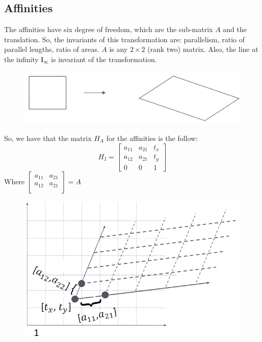 \documentclass[12pt, a4paper]{report}
\begin{document}
    \subsection{Affinities}
    The affinities have six degree of freedom, which are the sub-matrix $A$ and the translation. So, the invariants of this transformation are: parallelism, ratio of parallel lengths, ratio of areas.
    $A$ is any $2 \times 2$ (rank two) matrix. Also, the line at the infinity $\boldsymbol{l}_{\infty}$ is invariant of the transformation.
    \begin{figure}[H]
        \centering
        \includegraphics[width=0.5\linewidth]{images/affinities.png}
    \end{figure}
    So, we have that the matrix $H_A$ for the affinities is the follow: 
    \[H_I=
    \begin{bmatrix}
        a_{11} & a_{21} & t_x \\
        a_{12} & a_{21} & t_y \\
        0 & 0 & 1
    \end{bmatrix}\]
    Where $
    \begin{bmatrix}
        a_{11} & a_{21} \\
        a_{12} & a_{21} \\
    \end{bmatrix}
    =A$
    \begin{figure}[H]
        \centering
        \includegraphics[width=0.5\linewidth]{images/affinities1.png}
    \end{figure}
\end{document}
